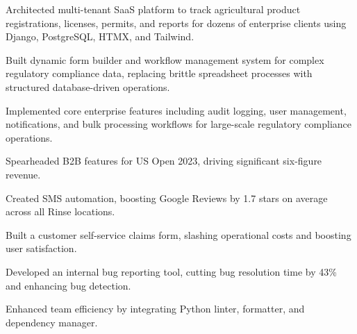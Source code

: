 \documentclass[]{deedy-resume-openfont}
\begin{document}
\hfill{}

\vspace{-4pt}
\begin{tightemize}%
\item Architected multi-tenant SaaS platform to track agricultural product registrations, licenses, permits, and reports for dozens of enterprise clients using Django, PostgreSQL, HTMX, and Tailwind.
\item Built dynamic form builder and workflow management system for complex regulatory compliance data, replacing brittle spreadsheet processes with structured database-driven operations.
\item Implemented core enterprise features including audit logging, user management, notifications, and bulk processing workflows for large-scale regulatory compliance operations.



\end{tightemize}
\sectionsep

\hfill{}

\vspace{-4pt}
\begin{tightemize}%
\item Spearheaded B2B features for US Open 2023, driving significant six-figure revenue.
\item Created SMS automation, boosting Google Reviews by 1.7 stars on average across all Rinse locations.
\item Built a customer self-service claims form, slashing operational costs and boosting user satisfaction.
\item Developed an internal bug reporting tool, cutting bug resolution time by 43\% and enhancing bug detection.
\item Enhanced team efficiency by integrating Python linter, formatter, and dependency manager.


\end{tightemize}
\sectionsep
\end{document}
